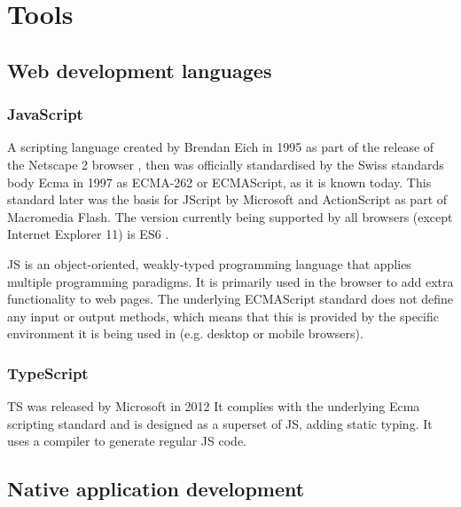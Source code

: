 \chapter{Tools}
\label{chapter:tools}


\section{Web development languages}



\subsection{JavaScript}

A scripting language created by Brendan Eich in 1995 as part of the release of the Netscape 2 browser \parencite{javascriptRelease}, then was officially standardised by the Swiss standards body Ecma in 1997 as ECMA-262 or ECMAScript, as it is known today. This standard later was the basis for JScript by Microsoft and ActionScript as part of Macromedia Flash. The version currently being supported by all browsers (except Internet Explorer 11) is \ac{ES6} \parencite{javascriptHistory}.

\ac{JS} is an object-oriented, weakly-typed programming language that applies multiple programming paradigms. It is primarily used in the browser to add extra functionality to web pages. The underlying ECMAScript standard does not define any input or output methods, which means that this is provided by the specific environment it is being used in (e.g. desktop or mobile browsers).

\subsection{TypeScript}

\ac{TS} was released by Microsoft in 2012  It complies with the underlying Ecma scripting standard and is designed as a superset of \ac{JS}, adding static typing. It uses a compiler to generate regular \ac{JS} code.


\section{Native application development}

